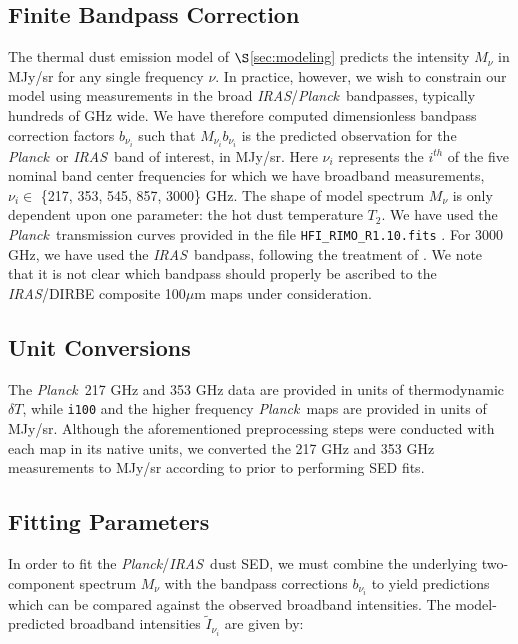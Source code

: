 \documentclass{emulateapj}
\newcommand{\IRAS}{{\it IRAS}}
\newcommand{\PLANCK}{{\it Planck}}
\begin{document}
\subsection{Finite Bandpass Correction}
\label{sec:bpcorr}
The thermal dust emission model of $\S$\ref{sec:modeling} predicts the 
intensity $M_{\nu}$ in MJy/sr for any single frequency $\nu$. In practice, 
however, we wish to constrain our model using measurements in the broad 
\IRAS/\PLANCK~bandpasses, typically hundreds of GHz wide. We have therefore 
computed dimensionless bandpass correction factors $b_{\nu_i}$ such that 
$M_{\nu_i}b_{\nu_i}$ is the predicted observation for the \PLANCK~or \IRAS~band
 of interest, in MJy/sr. Here $\nu_i$ represents the $i^{th}$ of the five 
nominal band center frequencies for which we have broadband measurements, 
$\nu_i \in$ \{217, 353, 545, 857, 3000\} GHz. The shape of model spectrum 
$M_{\nu}$ is only dependent upon one parameter: the hot dust temperature $T_2$.
 We have used the \PLANCK~transmission curves provided in the file 
\verb|HFI_RIMO_R1.10.fits| \citep{planckresponse}. For 3000 GHz, we have used 
the \IRAS~bandpass, following the treatment of \cite{planckdust}. We note that 
it is not clear which bandpass should properly be ascribed to the \IRAS/DIRBE 
composite 100$\mu$m maps under consideration. 

\subsection{Unit Conversions}

The \PLANCK~217 GHz and 353 GHz data are provided in units of thermodynamic 
$\delta T$, while \verb|i100| and the higher frequency \PLANCK~maps are 
provided in units of MJy/sr. Although the aforementioned preprocessing steps 
were conducted with each map in its native units, we converted the 217 GHz and 
353 GHz measurements to MJy/sr according to \cite{planckresponse} prior to 
performing SED fits.


\subsection{Fitting Parameters}
In order to fit the \PLANCK/\IRAS~dust SED, we must combine the underlying 
two-component spectrum $M_{\nu}$ with the bandpass corrections $b_{\nu_i}$ to 
yield predictions which can be compared against the observed broadband 
intensities. The model-predicted broadband intensities $\tilde{I}_{\nu_i}$ are 
given by:
\end{document}
